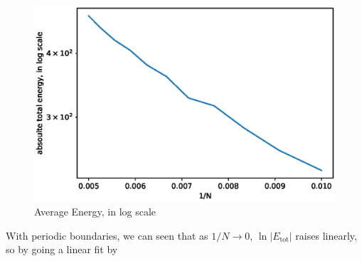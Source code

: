 \documentclass[UTF8,a4paper]{article}
\begin{document}
\begin{figure}[H]
\begin{minipage}[t]{0.6\textwidth}
		\centering
		\includegraphics[height=0.2\textheight]{fig/sc_exp1_loge.eps}
		\caption{Average Energy, in log scale}
	\end{minipage}
\end{figure}
With periodic boundaries, we can seen that as $1/N\to 0$, $\ln \left| E_\text{tot} \right|$ raises linearly, so by going a linear fit by 
\end{document}
